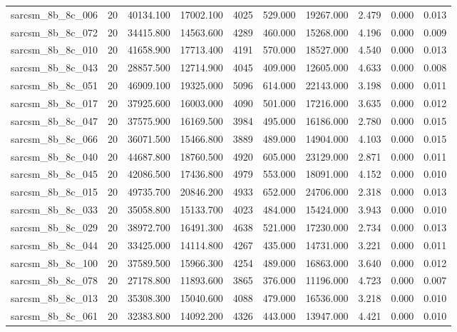 \begin{tabular}{lrrrrrrrrr}
sarcsm\_8b\_8c\_006 & 20 & 40134.100 & 17002.100 & 4025 & 529.000 & 19267.000 & 2.479 & 0.000 & 0.013 \\
sarcsm\_8b\_8c\_072 & 20 & 34415.800 & 14563.600 & 4289 & 460.000 & 15268.000 & 4.196 & 0.000 & 0.009 \\
sarcsm\_8b\_8c\_010 & 20 & 41658.900 & 17713.400 & 4191 & 570.000 & 18527.000 & 4.540 & 0.000 & 0.013 \\
sarcsm\_8b\_8c\_043 & 20 & 28857.500 & 12714.900 & 4045 & 409.000 & 12605.000 & 4.633 & 0.000 & 0.008 \\
sarcsm\_8b\_8c\_051 & 20 & 46909.100 & 19325.000 & 5096 & 614.000 & 22143.000 & 3.198 & 0.000 & 0.011 \\
sarcsm\_8b\_8c\_017 & 20 & 37925.600 & 16003.000 & 4090 & 501.000 & 17216.000 & 3.635 & 0.000 & 0.012 \\
sarcsm\_8b\_8c\_047 & 20 & 37575.900 & 16169.500 & 3984 & 495.000 & 16186.000 & 2.780 & 0.000 & 0.015 \\
sarcsm\_8b\_8c\_066 & 20 & 36071.500 & 15466.800 & 3889 & 489.000 & 14904.000 & 4.103 & 0.000 & 0.015 \\
sarcsm\_8b\_8c\_040 & 20 & 44687.800 & 18760.500 & 4920 & 605.000 & 23129.000 & 2.871 & 0.000 & 0.011 \\
sarcsm\_8b\_8c\_045 & 20 & 42086.500 & 17436.800 & 4979 & 553.000 & 18091.000 & 4.152 & 0.000 & 0.010 \\
sarcsm\_8b\_8c\_015 & 20 & 49735.700 & 20846.200 & 4933 & 652.000 & 24706.000 & 2.318 & 0.000 & 0.013 \\
sarcsm\_8b\_8c\_033 & 20 & 35058.800 & 15133.700 & 4023 & 484.000 & 15424.000 & 3.943 & 0.000 & 0.010 \\
sarcsm\_8b\_8c\_029 & 20 & 38972.700 & 16491.300 & 4638 & 521.000 & 17230.000 & 2.734 & 0.000 & 0.013 \\
sarcsm\_8b\_8c\_044 & 20 & 33425.000 & 14114.800 & 4267 & 435.000 & 14731.000 & 3.221 & 0.000 & 0.011 \\
sarcsm\_8b\_8c\_100 & 20 & 37589.500 & 15966.300 & 4254 & 489.000 & 16863.000 & 3.640 & 0.000 & 0.012 \\
sarcsm\_8b\_8c\_078 & 20 & 27178.800 & 11893.600 & 3865 & 376.000 & 11196.000 & 4.723 & 0.000 & 0.007 \\
sarcsm\_8b\_8c\_013 & 20 & 35308.300 & 15040.600 & 4088 & 479.000 & 16536.000 & 3.218 & 0.000 & 0.010 \\
sarcsm\_8b\_8c\_061 & 20 & 32383.800 & 14092.200 & 4326 & 443.000 & 13947.000 & 4.421 & 0.000 & 0.010 \\

\end{tabular}
